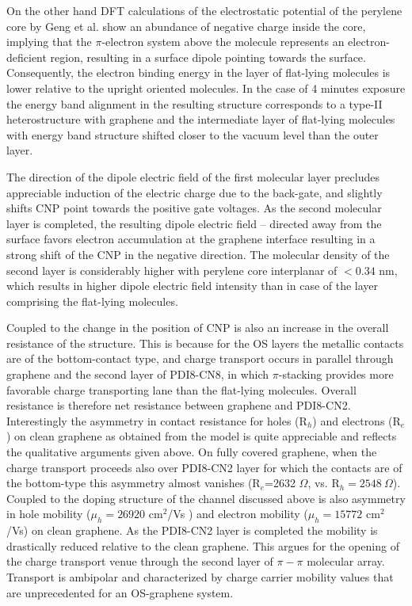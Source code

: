 \documentclass[preprint,aip,jap]{revtex4-2}
\begin{document}
 On the other hand DFT calculations of the electrostatic potential of the perylene core by Geng et al.
\cite{geng-2012} show an abundance of negative charge inside the core, implying  that the $\pi$-electron system above the molecule represents an electron-deficient region, resulting in a surface dipole pointing towards the surface.
 Consequently, the electron binding energy in the layer of flat-lying molecules is lower relative to the upright oriented molecules.
  In the case of 4 minutes exposure the energy band alignment in the resulting structure corresponds to a type-II heterostructure with graphene and the intermediate layer of flat-lying molecules with energy band structure shifted closer to the vacuum level than the outer layer.

  The direction of the dipole electric field of the first molecular layer precludes appreciable induction of the electric charge due to the back-gate, and slightly shifts CNP point towards the positive gate voltages.
 As the second molecular layer is completed, the resulting dipole electric field -- directed away from the surface favors electron accumulation at the graphene interface resulting in a strong shift of the CNP in the negative direction.
  The molecular density of the second layer is considerably higher with perylene core interplanar of $< 0.34$ nm, which results in higher dipole electric field intensity than in  case of the layer comprising the flat-lying molecules.


Coupled to the change in the position of CNP is also an increase in the overall resistance of the structure.
 This is because for the OS layers the metallic contacts are of the  bottom-contact type, and charge transport occurs in parallel through graphene and the second layer of PDI8-CN8, in which $\pi$-stacking provides more favorable charge transporting lane than the flat-lying molecules.
 Overall resistance is therefore net resistance between graphene and PDI8-CN2.
 Interestingly the asymmetry in contact resistance for holes (R$_{h}$) and  electrons  (R$_{e}$) on clean graphene as obtained from the model is quite appreciable and reflects the qualitative arguments given above.
  On fully covered graphene, when the charge transport proceeds also over PDI8-CN2 layer for which the contacts are of the bottom-type this asymmetry almost vanishes (R$_{e}$=2632 $\Omega$, vs. R$_{h}=2548\ \Omega$).
  Coupled to the doping structure of the channel discussed above is also asymmetry in hole mobility  ($\mu_{h}= 26920$ cm$^{2}$/Vs ) and electron mobility ($\mu_{h}= 15772$ cm$^{2}$/Vs) on clean graphene.
 As the PDI8-CN2 layer is completed the mobility is drastically reduced relative to the clean graphene.
  This argues for the opening of the charge transport venue through the second layer of $\pi-\pi$ molecular array.
 Transport is ambipolar and characterized by charge carrier mobility values that are unprecedented for an OS-graphene system.
\end{document}
